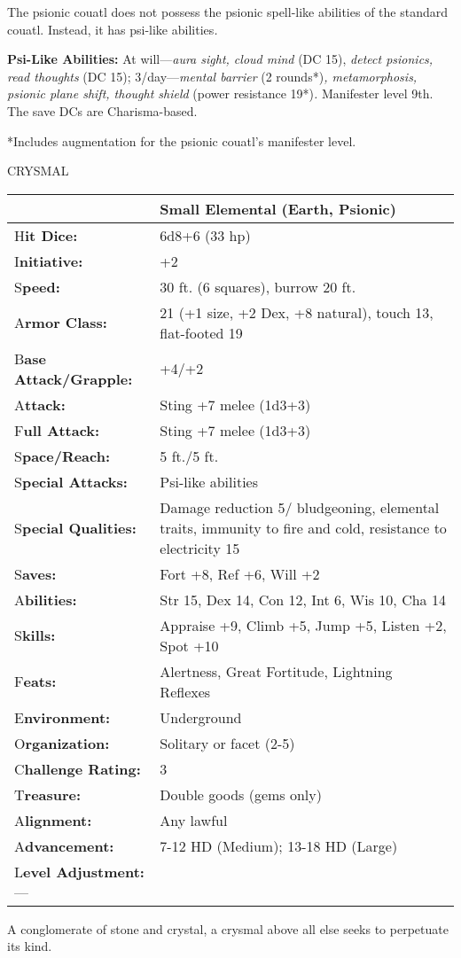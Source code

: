 \documentclass{article}
\begin{document}
The psionic couatl does not possess the psionic spell-like abilities of the standard 
couatl. Instead, it has psi-like abilities\textit{.}

\textbf{Psi-Like Abilities: }At will---\textit{aura sight, cloud mind }(DC 15), 
\textit{detect psionics, read thoughts }(DC 15); 3/day---\textit{mental barrier 
}(2 rounds*)\textit{, metamorphosis, psionic plane shift, thought shield }(power 
resistance 19*)\textit{. }Manifester level 9th. The save DCs are Charisma-based.

*Includes augmentation for the psionic couatl's manifester level.

\vspace{12pt}
{\LARGE{}CRYSMAL}

\begin{tabular}{|>{\raggedright}p{61pt}|>{\raggedright}p{264pt}|}
\hline
  & Small Elemental (Earth, Psionic)\tabularnewline
\hline
H\textbf{it Dice:} & 6d8+6 (33 hp)\tabularnewline
\hline
I\textbf{nitiative:} & +2\tabularnewline
\hline
S\textbf{peed:} & 30 ft. (6 squares), burrow 20 ft.\tabularnewline
\hline
A\textbf{rmor Class:} & 21 (+1 size, +2 Dex, +8 natural), touch 13, flat-footed 
19\tabularnewline
\hline
B\textbf{ase Attack/Grapple:} & +4/+2\tabularnewline
\hline
A\textbf{ttack:} & Sting +7 melee (1d3+3)\tabularnewline
\hline
F\textbf{ull Attack:} & Sting +7 melee (1d3+3)\tabularnewline
\hline
S\textbf{pace/Reach:} & 5 ft./5 ft.\tabularnewline
\hline
S\textbf{pecial Attacks:} & Psi-like abilities\tabularnewline
\hline
S\textbf{pecial Qualities:} & Damage reduction 5/ bludgeoning, elemental traits, 
immunity to fire and cold, resistance to electricity 15 \tabularnewline
\hline
S\textbf{aves:} & Fort +8, Ref +6, Will +2\tabularnewline
\hline
A\textbf{bilities:} & Str 15, Dex 14, Con 12, Int 6, Wis 10, Cha 14\tabularnewline
\hline
S\textbf{kills:} & Appraise +9, Climb +5, Jump +5, Listen +2, Spot +10\tabularnewline
\hline
F\textbf{eats:} & Alertness, Great Fortitude, Lightning Reflexes\tabularnewline
\hline
E\textbf{nvironment:} & Underground\tabularnewline
\hline
O\textbf{rganization:} & Solitary or facet (2-5)\tabularnewline
\hline
C\textbf{hallenge Rating:} & 3\tabularnewline
\hline
T\textbf{reasure:} & Double goods (gems only)\tabularnewline
\hline
A\textbf{lignment:} & Any lawful\tabularnewline
\hline
A\textbf{dvancement:} & 7-12 HD (Medium); 13-18 HD (Large)\tabularnewline
\hline
L\textbf{evel Adjustment:}--- & \tabularnewline
\hline
\end{tabular}

A conglomerate of stone and crystal, a crysmal above all else seeks to perpetuate 
its kind.
\end{document}
